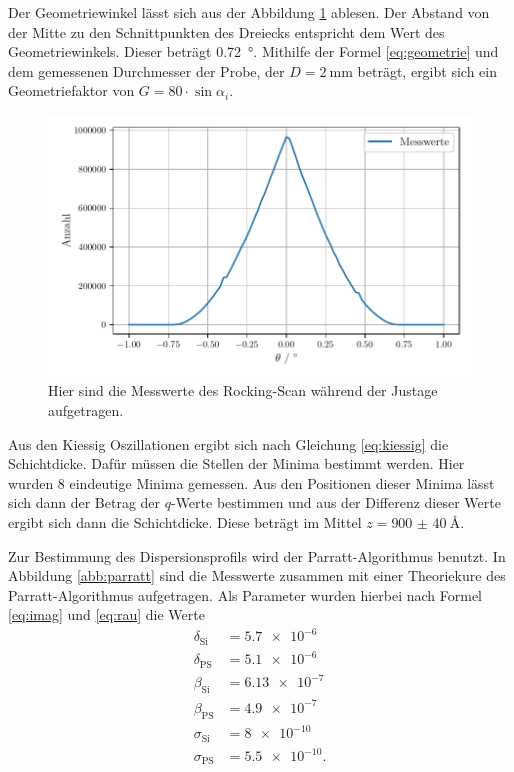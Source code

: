 Der Geometriewinkel lässt sich aus der Abbildung \ref{abb:dreieck} ablesen. Der Abstand von der Mitte zu den Schnittpunkten des Dreiecks entspricht dem Wert des Geometriewinkels. Dieser beträgt \SI{0.72}{\degree}. Mithilfe der Formel \eqref{eq:geometrie} und dem gemessenen Durchmesser der Probe, der $D = \SI{2}{\milli\metre}$ beträgt, ergibt sich ein Geometriefaktor von $G = \num{80} \cdot \sin \alpha_i$.

\begin{figure}
    \centering
    \includegraphics[width=\textwidth]{figures/dreieck.pdf}
    \caption{Hier sind die Messwerte des Rocking-Scan während der Justage aufgetragen.}
    \label{abb:dreieck}
\end{figure}

Aus den Kiessig Oszillationen ergibt sich nach Gleichung \eqref{eq:kiessig} die Schichtdicke. 
Dafür müssen die Stellen der Minima bestimmt werden. Hier wurden 8 eindeutige Minima gemessen. Aus den Positionen dieser Minima lässt sich dann der Betrag der $q$-Werte bestimmen und aus der Differenz dieser Werte ergibt sich dann die Schichtdicke. Diese beträgt im Mittel $z = \SI{900(40)}{\angstrom}$. 

Zur Bestimmung des Dispersionsprofils wird der Parratt-Algorithmus benutzt. 
In Abbildung \ref{abb:parratt} sind die Messwerte zusammen mit einer Theoriekure des Parratt-Algorithmus aufgetragen. 
Als Parameter wurden hierbei nach Formel \eqref{eq:imag} und \eqref{eq:rau} die Werte 
\begin{align*}
 \delta_\text{Si} &= \num{5.7e-6}\\
 \delta_\text{PS} &= \num{5.1e-6} \\
 \beta_\text{Si} &= \num{6.13e-7}\\
 \beta_\text{PS} &= \num{4.9e-7} \\
 \sigma_\text{Si} &= \num{8e-10} \\
 \sigma_\text{PS} &= \num{5.5e-10}. \\
\end{align*}

